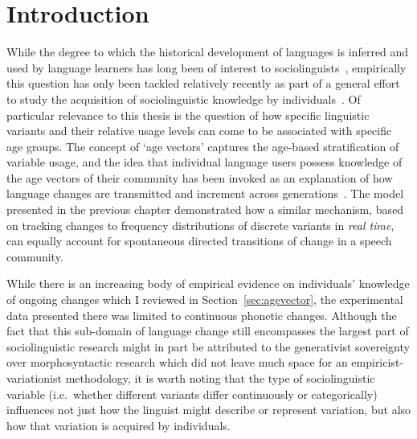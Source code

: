 \section{Introduction}

While the degree to which the historical development of languages is inferred and used by language learners has long been of interest to sociolinguists~\citep{Labov1989}, empirically this question has only been tackled relatively recently as part of a general effort to study the acquisition of sociolinguistic knowledge by individuals~\citep{Labov2014}.
Of particular relevance to this thesis is the question of how specific linguistic variants and their relative usage levels can come to be associated with specific age groups.
The concept of `age vectors' captures the age-based stratification of variable usage, and the idea that individual language users possess knowledge of the age vectors of their community has been invoked as an explanation of how language changes are transmitted and increment across generations~\citep{Labov2001}.
The model presented in the previous chapter demonstrated how a similar mechanism, based on tracking changes to frequency distributions of discrete variants in \emph{real time}, can equally account for spontaneous directed transitions of change in a speech community.

While there is an increasing body of empirical evidence on individuals' knowledge of ongoing changes which I reviewed in Section~\ref{sec:agevector}, the experimental data presented there was limited to continuous phonetic changes. Although the fact that this sub-domain of language change still encompasses the largest part of sociolinguistic research might in part be attributed to the generativist sovereignty over morphosyntactic research which did not leave much space for an empiricist-variationist methodology, it is worth noting that the type of sociolinguistic variable (i.e.~whether different variants differ continuously or categorically) influences not just how the linguist might describe or represent variation, but also how that variation is acquired by individuals. %


